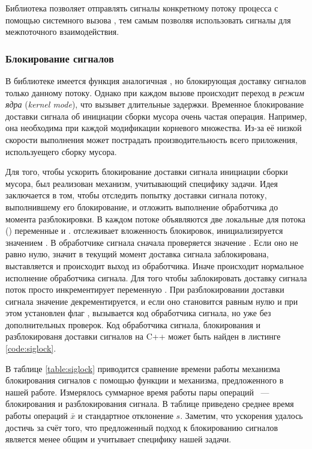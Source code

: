 Библиотека  позволяет отправлять сигналы конкретному потоку процесса с 
помощью системного вызова , тем самым позволяя использовать сигналы 
для межпоточного взаимодействия.


\subsubsection{Блокирование сигналов}
В библиотеке  имеется функция  аналогичная 
, но блокирующая доставку сигналов только данному потоку. 
Однако при каждом вызове  происходит переход в \emph{режим ядра} 
(\emph{kernel mode}), что вызывет длительные задержки. 
Временное блокирование доставки сигнала об инициации сборки мусора очень частая операция. 
Например, она необходима при каждой модификации корневого множества. 
Из-за её низкой скорости выполнения может пострадать производительность всего приложения, 
используещего сборку мусора. 

Для того, чтобы ускорить блокирование доставки сигнала инициации сборки мусора, был 
реализован механизм, учитывающий специфику задачи. 
Идея заключается в том, чтобы отследить попытку доставки сигнала потоку, выполнившему его 
блокирование, и отложить выполнение обработчика до момента разблокировки. 
В каждом потоке объявляются две локальные для потока () переменные 
 и .  отслеживает вложенность блокировок, 
 инициализируется значением . 
В обработчике сигнала сначала проверяется значение . 
Если оно не равно нулю, значит в текущий момент доставка сигнала заблокирована, 
выставляется  и происходит выход из обработчика. 
Иначе происходит нормальное исполнение обработчика сигнала. 
Для того чтобы заблокировать доставку сигнала поток просто инкрементирует переменную 
. 
При разблокировании доставки сигнала значение  декрементируется, и если оно 
становится равным нулю и при этом установлен флаг , вызывается код 
обработчика сигнала, но уже без дополнительных проверок. 
Код обработчика сигнала, блокирования и разблокированя доставки сигналов на C++ может быть 
найден в листинге \ref{code:siglock}.

В таблице \ref{table:siglock} приводится сравнение времени работы механизма блокирования 
сигналов с помощью функции  и механизма, предложенного в нашей работе. 
Измерялось суммарное время работы пары операций ~---~ блокирования и разблокирования сигнала. 
В таблице приведено среднее время работы операций $\bar{x}$ и стандартное отклонение $s$. 
Заметим, что ускорения удалось достичь за счёт того, что предложенный подход к блокированию 
сигналов является менее общим и учитывает специфику нашей задачи.

